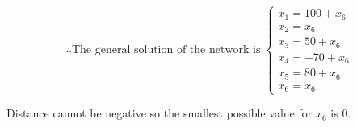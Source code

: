 \documentclass[12pt, a4paper]{article}
\begin{document}
\[
    \therefore \text{The general solution of the network is:} \begin{cases}
        x_1 = 100 + x_6 \\
        x_2 = x_6 \\
        x_3 = 50 + x_6 \\
        x_4 = -70 + x_6 \\
        x_5 = 80 + x_6 \\
        x_6 = x_6
    \end{cases}
\]

Distance cannot be negative so the smallest possible value for $x_6$ is $0$.
\end{document}
